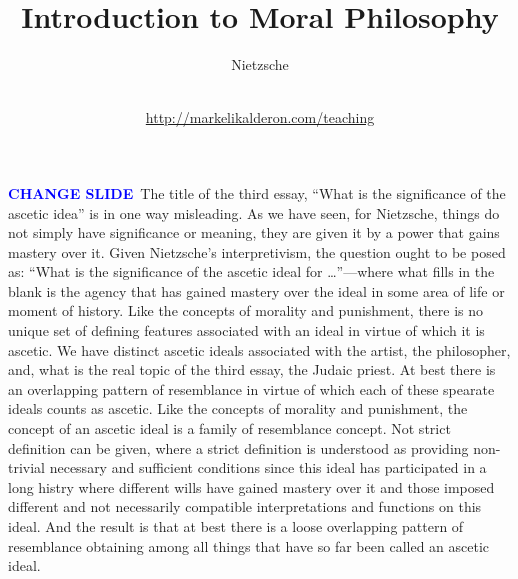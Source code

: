 %
%
%

\newcommand{\change}{\textcolor{blue}{\textbf{CHANGE SLIDE}}}
\nwcommand{} 
\newcommand\mytitle{Introduction to Moral Philosophy}
\newcommand\mysubtitle{Nietzsche}
\newcommand\myinstitution{University College London}
\newcommand\myurl{http://markelikalderon.com/teaching}



\usepackage{pgf}
\usepackage{tikz}
\usepackage{hyperref}

\title{\mytitle}
\subtitle
{\mysubtitle}

\author{\myauthor\\
\url{\myurl}}
\institute{\myinstitution}




\frame{\maketitle}

\change\ The title of the third essay, ``What is the significance of the ascetic idea'' is in one way misleading. As we have seen, for Nietzsche, things do not simply have significance or meaning, they are given it by a power that gains mastery over it. Given Nietzsche's interpretivism, the question ought to be posed as: ``What is the significance of the ascetic ideal for \ldots''---where what fills in the blank is the agency that has gained mastery over the ideal in some area of life or moment of history. Like the concepts of morality and punishment, there is no unique set of defining features associated with an ideal in virtue of which it is ascetic. We have distinct ascetic ideals associated with the artist, the philosopher, and, what is the real topic of the third essay, the Judaic priest. At best there is an overlapping pattern of resemblance in virtue of which each of these spearate ideals counts as ascetic. Like the concepts of morality and punishment, the concept of an ascetic ideal is a family of resemblance concept. Not strict definition can be given, where a strict definition is understood as providing non-trivial necessary and sufficient conditions since this ideal has participated in a long histry where different wills have gained mastery over it and those imposed different and not necessarily compatible interpretations and functions on this ideal. And the result is that at best there is a loose overlapping pattern of resemblance obtaining among all things that have so far been called an ascetic ideal.

